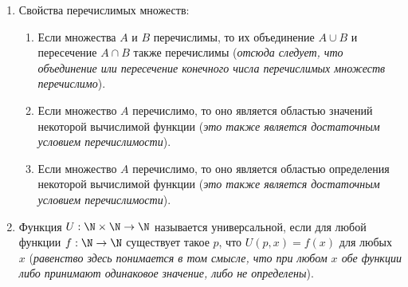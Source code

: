 \documentclass[a4paper,12pt]{article}
\begin{document}
\begin{enumerate}
		\item
		Свойства перечислимых множеств:
		\begin{enumerate}
		    \item Если множества $A$ и $B$ перечислимы, то их объединение $A \cup B$ и пересечение $A \cap B$ также перечислимы (\textit{отсюда следует, что объединение или пересечение конечного числа перечислимых множеств перечислимо}).
		    \item Если множество $A$ перечислимо, то оно является областью значений некоторой вычислимой функции (\textit{это также является достаточным условием перечислимости}).
		    \item Если множество $A$ перечислимо, то оно является областью определения некоторой вычислимой функции (\textit{это также является достаточным условием перечислимости}).
		\end{enumerate}
		\item
		Функция $U:\N\times\N\to\N$ называется универсальной, если для любой функции $f: \N\to\N$ существует такое $p$, что $U(p, x)=f(x)$ для любых $x$ (\textit{равенство здесь понимается в том смысле, что при любом $x$ обе функции либо принимают одинаковое значение, либо не определены}).
	\end{enumerate}
		
	
\end{document}
